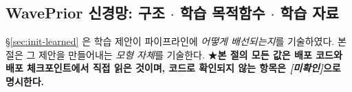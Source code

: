 \documentclass[11pt]{report}
\numberwithin{equation}{chapter}
\numberwithin{figure}{chapter}
\numberwithin{table}{chapter}
\begin{document}
\subsection{WavePrior 신경망: 구조 $\cdot$ 학습 목적함수 $\cdot$ 학습 자료}
\label{sec:waveprior-net}


\S\ref{sec:init-learned} 은 학습 제안이 파이프라인에 \emph{어떻게 배선되는지}를 기술하였다.
본 절은 그 제안을 만들어내는 \emph{모형 자체}를 기술한다.
★\textbf{본 절의 모든 값은 배포 코드와 배포 체크포인트에서 직접 읽은 것이며, 코드로 확인되지
않는 항목은 \emph{[미확인]}으로 명시한다.}
\end{document}
